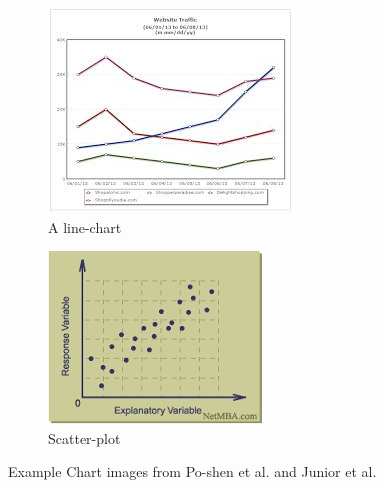 \documentclass[12pt, a4paper,oneside]{report}
\begin{document}
\begin{figure}[!htbp]
	\begin{subfigure}[b]{0.5\textwidth}
		\includegraphics[width=\textwidth]{rand3}
		\caption{A line-chart}
		\label{fig:rand3}
	\end{subfigure}
	\begin{subfigure}[b]{0.5\textwidth}
		\includegraphics[width=\textwidth]{rand4}
		\caption{Scatter-plot}
		\label{fig:rand4}
	\end{subfigure}
	\caption{Example Chart images from Po-shen et al. and Junior et al.}
    \label{fig:random}
\end{figure}
\end{document}
